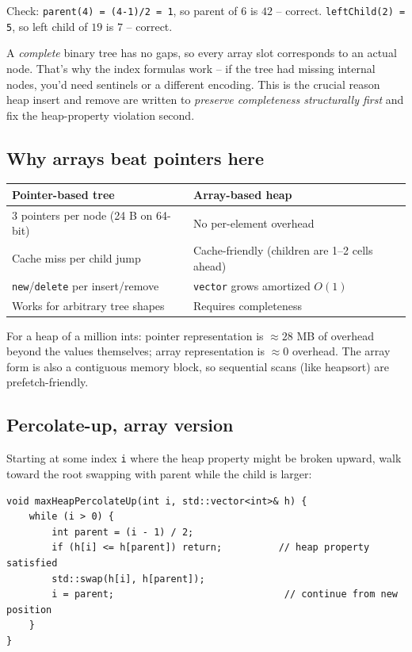 \documentclass[11pt]{article}
\begin{document}
Check: \texttt{parent(4) = (4-1)/2 = 1}, so parent of $6$ is $42$ -- correct. \texttt{leftChild(2) = 5}, so left child of $19$ is $7$ -- correct.

\begin{ideabox}
A \emph{complete} binary tree has no gaps, so every array slot corresponds to an actual node. That's why the index formulas work -- if the tree had missing internal nodes, you'd need sentinels or a different encoding. This is the crucial reason heap insert and remove are written to \emph{preserve completeness structurally first} and fix the heap-property violation second.
\end{ideabox}

\subsection*{Why arrays beat pointers here}

\begin{center}
\begin{tabular}{ll}
Pointer-based tree       & Array-based heap \\
\hline
3 pointers per node (24 B on 64-bit) & No per-element overhead \\
Cache miss per child jump           & Cache-friendly (children are 1--2 cells ahead) \\
\texttt{new}/\texttt{delete} per insert/remove & \texttt{vector} grows amortized $O(1)$ \\
Works for arbitrary tree shapes     & Requires completeness \\
\end{tabular}
\end{center}

For a heap of a million ints: pointer representation is $\approx 28$ MB of overhead beyond the values themselves; array representation is $\approx 0$ overhead. The array form is also a contiguous memory block, so sequential scans (like heapsort) are prefetch-friendly.

\subsection*{Percolate-up, array version}

Starting at some index \texttt{i} where the heap property might be broken upward, walk toward the root swapping with parent while the child is larger:

\begin{lstlisting}
void maxHeapPercolateUp(int i, std::vector<int>& h) {
    while (i > 0) {
        int parent = (i - 1) / 2;
        if (h[i] <= h[parent]) return;          // heap property satisfied
        std::swap(h[i], h[parent]);
        i = parent;                              // continue from new position
    }
}
\end{lstlisting}
\end{document}
